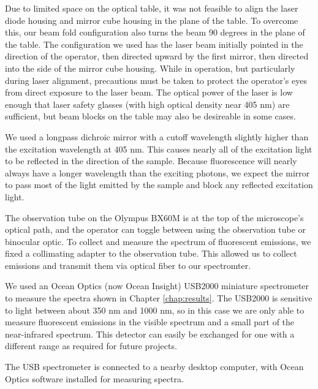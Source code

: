 Due to limited space on the optical table, it was not feasible to align the laser diode housing and mirror cube housing in the plane of the table. To overcome this, our beam fold configuration also turns the beam 90 degrees in the plane of the table. The configuration we used has the laser beam initially pointed in the direction of the operator, then directed upward by the first mirror, then directed into the side of the mirror cube housing. While in operation, but particularly during laser alignment, precautions must be taken to protect the operator's eyes from direct exposure to the laser beam. The optical power of the laser is low enough that laser safety glasses (with high optical density near 405 nm) are sufficient, but beam blocks on the table may also be desireable in some cases.

We used a longpass dichroic mirror with a cutoff wavelength slightly higher than the excitation wavelength at 405 nm. This causes nearly all of the excitation light to be reflected in the direction of the sample. Because fluorescence will nearly always have a longer wavelength than the exciting photons, we expect the mirror to pass most of the light emitted by the sample and block any reflected excitation light.

The observation tube on the Olympus BX60M is at the top of the microscope's optical path, and the operator can toggle between using the observation tube or binocular optic. To collect and measure the spectrum of fluorescent emissions, we fixed a collimating adapter to the observation tube. This allowed us to collect emissions and transmit them via optical fiber to our spectromter.

We used an Ocean Optics (now Ocean Insight) USB2000 miniature spectrometer to measure the spectra shown in Chapter \ref{chap:results}. The USB2000 is sensitive to light between about 350 nm and 1000 nm, so in this case we are only able to measure fluorescent emissions in the visible spectrum and a small part of the near-infrared spectrum. This detector can easily be exchanged for one with a different range as required for future projects.

The USB spectrometer is connected to a nearby desktop computer, with Ocean Optics software installed for measuring spectra.

